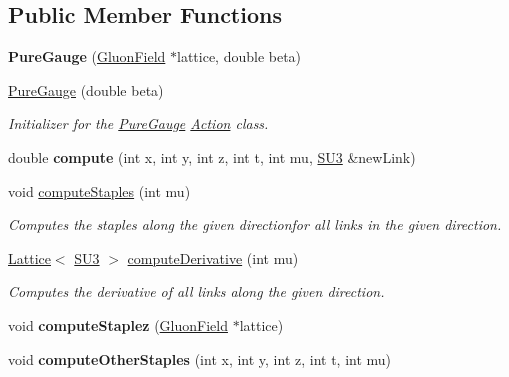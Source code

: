 \subsection*{Public Member Functions}
\begin{DoxyCompactItemize}
\item 
{\bfseries Pure\+Gauge} (\hyperlink{classField}{Gluon\+Field} $\ast$lattice, double beta)\hypertarget{classPureGauge_ae832fd1e6b53f6ca3d22961f4a2f80f7}{}\label{classPureGauge_ae832fd1e6b53f6ca3d22961f4a2f80f7}

\item 
\hyperlink{classPureGauge_ab219e717e036ee44696ba360a2b3674b}{Pure\+Gauge} (double beta)
\begin{DoxyCompactList}\small\item\em Initializer for the \hyperlink{classPureGauge}{Pure\+Gauge} \hyperlink{classAction}{Action} class. \end{DoxyCompactList}\item 
double {\bfseries compute} (int x, int y, int z, int t, int mu, \hyperlink{structSU3}{S\+U3} \&new\+Link)\hypertarget{classPureGauge_a17facfc54c75a588826c00f8ef185bf0}{}\label{classPureGauge_a17facfc54c75a588826c00f8ef185bf0}

\item 
void \hyperlink{classPureGauge_a7c78eb206450a209b4154fc936d8aad1}{compute\+Staples} (int mu)
\begin{DoxyCompactList}\small\item\em Computes the staples along the given directionfor all links in the given direction. \end{DoxyCompactList}\item 
\hyperlink{classLattice}{Lattice}$<$ \hyperlink{structSU3}{S\+U3} $>$ \hyperlink{classPureGauge_a0d9272be98cf62567bbda93a892718eb}{compute\+Derivative} (int mu)
\begin{DoxyCompactList}\small\item\em Computes the derivative of all links along the given direction. \end{DoxyCompactList}\item 
void {\bfseries compute\+Staplez} (\hyperlink{classField}{Gluon\+Field} $\ast$lattice)\hypertarget{classPureGauge_a28706ff95422d3ac6e1dc9d2aabccf1a}{}\label{classPureGauge_a28706ff95422d3ac6e1dc9d2aabccf1a}

\item 
void {\bfseries compute\+Other\+Staples} (int x, int y, int z, int t, int mu)\hypertarget{classPureGauge_a5722f484c169539471da120aefa97dea}{}\label{classPureGauge_a5722f484c169539471da120aefa97dea}

\end{DoxyCompactItemize}
